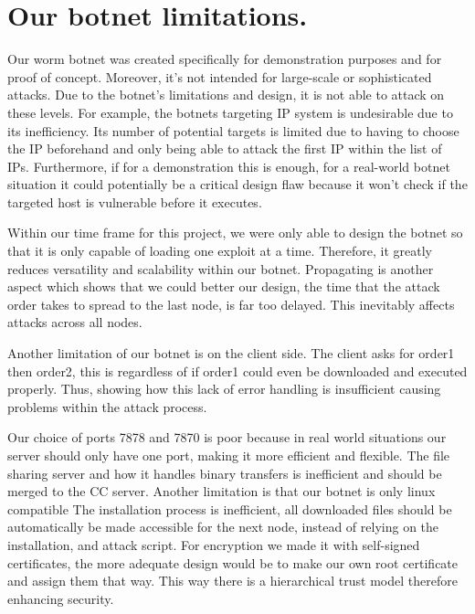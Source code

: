 \documentclass[../main.tex]{subfiles}
\begin{document}
	\chapter{Our botnet limitations.}


    Our worm botnet was created specifically for demonstration purposes and for proof of concept. 
    Moreover, it's not intended for large-scale or sophisticated attacks. 
    Due to the botnet's limitations and design, it is not able to attack on these levels. 
    For example, the botnets targeting IP system is undesirable due to its inefficiency. 
    Its number of potential targets is limited due to having to choose the IP beforehand and only being able to attack the first IP within the list of IPs. 
    Furthermore, if for a demonstration this is enough, for a real-world botnet situation it could potentially be a critical design flaw because it won't check if the targeted host is vulnerable before it executes. 

    Within our time frame for this project, we were only able to design the botnet so that it is only capable of loading one exploit at a time. 
    Therefore, it greatly reduces versatility and scalability within our botnet. 
    Propagating is another aspect which shows that we could better our design, the time that the attack order takes to spread to the last node, is far too delayed. 
    This inevitably affects attacks across all nodes.

    Another limitation of our botnet is on the client side. 
    The client asks for order1 then order2, this is regardless of if order1 could even be downloaded and executed properly. 
    Thus, showing how this lack of error handling is insufficient causing problems within the attack process. 

    Our choice of ports 7878 and 7870 is poor because in real world situations our server should only have one port, making it more efficient and flexible. 
    The file sharing server and how it handles binary transfers is inefficient and should be merged to the CC server.
    Another limitation is that our botnet is only linux compatible
    The installation process is inefficient, all downloaded files should be automatically be made accessible for the next node, instead of relying on the installation, and attack script. 
    For encryption we made it with self-signed certificates, the more adequate design would be to make our own root certificate and assign them that way. 
    This way there is a hierarchical trust model therefore enhancing security.
\end{document}
